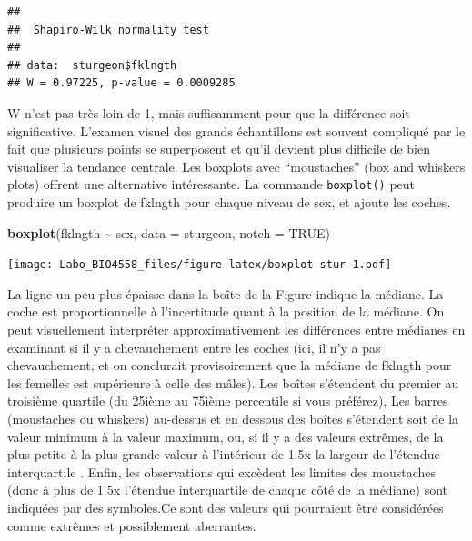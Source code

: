 \documentclass[
  12pt,
]{book}
\newenvironment{Shaded}{\begin{snugshade}}{\end{snugshade}}
\newcommand{\DataTypeTok}[1]{\textcolor[rgb]{0.13,0.29,0.53}{#1}}
\newcommand{\KeywordTok}[1]{\textcolor[rgb]{0.13,0.29,0.53}{\textbf{#1}}}
\newcommand{\NormalTok}[1]{#1}
\newcommand{\OperatorTok}[1]{\textcolor[rgb]{0.81,0.36,0.00}{\textbf{#1}}}
\newcommand{\OtherTok}[1]{\textcolor[rgb]{0.56,0.35,0.01}{#1}}
\newcommand{\StringTok}[1]{\textcolor[rgb]{0.31,0.60,0.02}{#1}}
\begin{document}
\begin{Shaded}
\end{Shaded}

\begin{verbatim}
## 
##  Shapiro-Wilk normality test
## 
## data:  sturgeon$fklngth
## W = 0.97225, p-value = 0.0009285
\end{verbatim}

W n'est pas très loin de 1, mais suffisamment pour que la différence soit significative.
L'examen visuel des grands échantillons est souvent compliqué par le fait que plusieurs points se superposent et qu'il devient plus difficile de bien visualiser la tendance centrale.
Les boxplots avec ``moustaches'' (box and whiskers plots) offrent une alternative intéressante.
La commande \texttt{boxplot()} peut produire un boxplot de fklngth pour chaque niveau de sex, et ajoute les coches.

\begin{Shaded}
\begin{Highlighting}[]
\KeywordTok{boxplot}\NormalTok{(fklngth }\OperatorTok{\textasciitilde{}}\StringTok{ }\NormalTok{sex, }\DataTypeTok{data =}\NormalTok{ sturgeon, }\DataTypeTok{notch =} \OtherTok{TRUE}\NormalTok{)}
\end{Highlighting}
\end{Shaded}

\texttt{[image: Labo\_BIO4558\_files/figure-latex/boxplot-stur-1.pdf]}

La ligne un peu plus épaisse dans la boîte de la Figure indique la médiane.
La coche est proportionnelle à l'incertitude quant à la position de la médiane.
On peut visuellement interpréter approximativement les différences entre médianes en examinant si il y a chevauchement entre les coches (ici, il n'y a pas chevauchement, et on conclurait provisoirement que la médiane de fklngth pour les femelles est supérieure à celle des mâles).
Les boîtes s'étendent du premier au troisième quartile (du 25ième au 75ième percentile si vous préférez), Les barres (moustaches ou whiskers) au-dessus et en dessous des boîtes s'étendent soit de la valeur minimum à la valeur maximum, ou, si il y a des valeurs extrêmes, de la plus petite à la plus grande valeur à l'intérieur de 1.5x la largeur de l'étendue interquartile .
Enfin, les observations qui excèdent les limites des moustaches (donc à plus de 1.5x l'étendue interquartile de chaque côté de la médiane) sont indiquées par des symboles.Ce sont des valeurs qui pourraient être considérées comme extrêmes et possiblement aberrantes.
\end{document}

